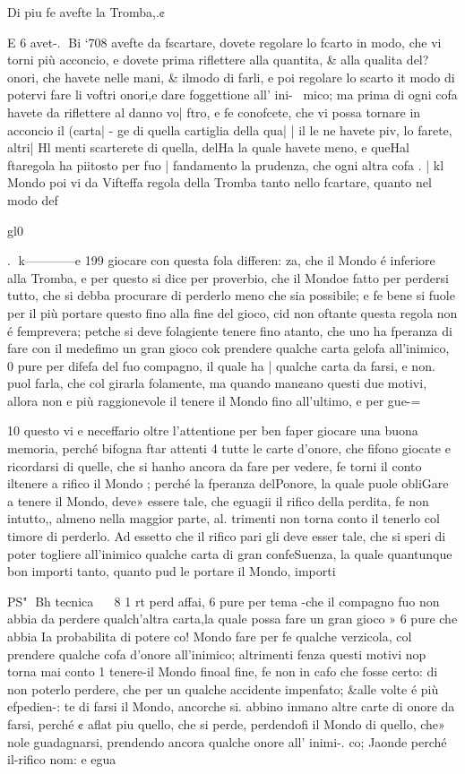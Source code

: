 \documentclass[12pt,a6paper]{article}
\begin{document}
Di piu fe avefte la Tromba,.¢

E 6 avet-.
Bi ‘708
avefte da fscartare, dovete regolare lo fcarto in modo, che vi
torni più acconcio, e dovete
prima riflettere alla quantita, &
alla qualita del?onori, che havete nelle mani, & ilmodo di
farli, e poi regolare lo scarto it
modo di potervi fare li voftri
onori,e dare foggettione all’ ini-~
mico; ma prima di ogni cofa
havete da riflettere al danno vo| ftro, e fe conofcete, che vi possa tornare in acconcio il (carta| - ge di quella cartiglia della qua| | il le ne havete piv, lo farete, altri| Hl menti scarterete di quella, delHa la quale havete meno, e queHal ftaregola ha piitosto per fuo
| fandamento la prudenza, che
ogni altra cofa .
| kl Mondo poi vi da Vifteffa regola della Tromba tanto nello
fcartare, quanto nel modo def

gl0~

.
k————e
199
giocare con questa fola differen:
za, che il Mondo é inferiore alla Tromba, e per questo si dice
per proverbio, che il Mondoe
fatto per perdersi tutto, che si
debba procurare di perderlo
meno che sia possibile; e fe bene
si fuole per il più portare questo
fino alla fine del gioco, cid non
oftante questa regola non é femprevera; petche si deve folagiente tenere fino atanto, che
uno ha fperanza di fare con il
medefimo un gran gioco cok
prendere qualche carta gelofa
all’inimico, 0 pure per difefa
del fuo compagno, il quale ha
| qualche carta da farsi, e non.
puol farla, che col girarla folamente, ma quando man¢ano
questi due motivi, allora non e
più raggionevole il tenere il
Mondo fino all’ultimo, e per
gue-=

 
 

10
questo vi e neceffario oltre l’attentione per ben faper giocare
una buona memoria, perché bifogna ftar attenti 4 tutte le carte d’onore, che fifono giocate
e ricordarsi di quelle, che si hanho ancora da fare per vedere,
fe torni il conto iltenere a rifico il Mondo ; perché la fperanza
delPonore, la quale puole obliGare a tenere il Mondo, deve»
essere tale, che eguagii il rifico
della perdita, fe non intutto,,
almeno nella maggior parte, al.
trimenti non torna conto il tenerlo col timore di perderlo.
Ad essetto che il rifico pari
gli deve esser tale, che si speri
di poter togliere all’inimico
qualche carta di gran confeSuenza, la quale quantunque
bon importi tanto, quanto pud
le portare il Mondo, importi

PS"
Bh tecnica
~~ 8 1 rt
perd affai, 6 pure per tema
-che il compagno fuo non abbia
da perdere qualch’altra carta,la
quale possa fare un gran gioco »
6 pure che abbia Ia probabilita
di potere co! Mondo fare per fe
qualche verzicola, col prendere
qualche cofa d’onore all’inimico; altrimenti fenza questi motivi nop torna mai conto 1 tenere-il Mondo finoal fine, fe
non in cafo che fosse certo: di
non poterlo perdere, che per
un qualche accidente impenfato; &alle volte é più efpedien-:
te di farsi il Mondo, ancorche si.
abbino inmano altre carte di
onore da farsi, perché ¢ aflat
piu quello, che si perde, perdendofi il Mondo di quello, che»
nole guadagnarsi, prendendo
ancora qualche onore all’ inimi-.
co; Jaonde perché il-rifico nom:
e egua 
\end{document}

